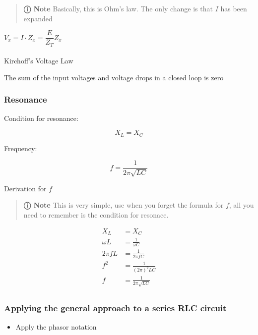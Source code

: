 \documentclass[
  a4paper,
]{article}
\makeatletter
\let\oldparagraph\paragraph
\renewcommand{\paragraph}{
    \@ifstar
      \xxxParagraphStar
      \xxxParagraphNoStar
  }
\newcommand{\xxxParagraphStar}[1]{\oldparagraph*{#1}\mbox{}}
\newcommand{\xxxParagraphNoStar}[1]{\oldparagraph{#1}\mbox{}}
\providecommand{\tightlist}{%
  \setlength{\itemsep}{0pt}\setlength{\parskip}{0pt}}
\makeatother
\begin{document}
\begin{quote}
\textbf{ⓘ Note} Basically, this is Ohm's law. The only change is that
\(I\) has been expanded
\end{quote}

\(V_x = I \cdot Z_x = \dfrac{E}{Z_T}Z_x\)

\paragraph{Kirchoff's Voltage Law}\label{kirchoffs-voltage-law}

The sum of the input voltages and voltage drops in a closed loop is zero

\subsubsection{Resonance}\label{resonance}

Condition for resonance:

\[X_L = X_C\]

Frequency:

\[f = \frac{1}{2\pi\sqrt{LC}}\]

Derivation for \(f\)

\begin{quote}
\textbf{ⓘ Note} This is very simple, use when you forget the formula for
\(f\), all you need to remember is the condition for resonace.
\end{quote}

\[
\begin{align*}
    X_L &= X_C \\
    \omega L &= \frac{1}{\omega C} \\
    2\pi fL &= \frac{1}{2\pi fC} \\
    f^2 &= \frac{1}{(2\pi)^2LC} \\
    f& = \frac{1}{2\pi\sqrt{LC}} \\
\end{align*}
\]

\subsubsection{Applying the general approach to a series RLC
circuit}\label{applying-the-general-approach-to-a-series-rlc-circuit}

\begin{itemize}
\tightlist
\item
  Apply the phasor notation
\end{itemize}
\end{document}
